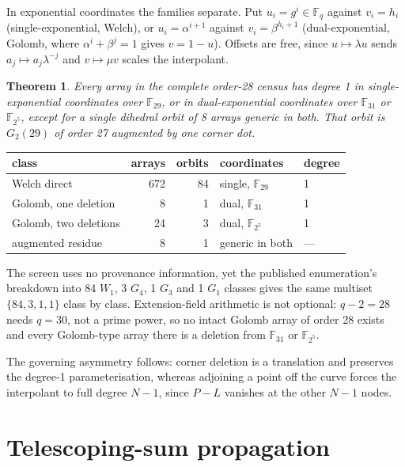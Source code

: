 \documentclass[11pt,a4paper]{article}
\newtheorem{theorem}{Theorem}[section]
\theoremstyle{definition}
\theoremstyle{remark}
\newcommand{\F}{\mathbb{F}}
\begin{document}
In exponential coordinates the families separate. Put $u_i=g^i\in\F_q$ against
$v_i=h_i$ (single-exponential, Welch), or $u_i=\alpha^{i+1}$ against
$v_i=\beta^{h_i+1}$ (dual-exponential, Golomb, where $\alpha^i+\beta^j=1$ gives
$v=1-u$). Offsets are free, since $u\mapsto\lambda u$ sends $a_j\mapsto
a_j\lambda^{-j}$ and $v\mapsto\mu v$ scales the interpolant.

\begin{theorem}\label{thm:coord}
Every array in the complete order-28 census has degree 1 in single-exponential
coordinates over $\F_{29}$, or in dual-exponential coordinates over $\F_{31}$ or
$\F_{2^5}$, except for a single dihedral orbit of 8 arrays generic in both. That
orbit is $G_2(29)$ of order 27 augmented by one corner dot.
\end{theorem}

\begin{center}
\begin{tabular}{@{}lrrll@{}}
\toprule
class & arrays & orbits & coordinates & degree \\
\midrule
Welch direct & 672 & 84 & single, $\F_{29}$ & 1 \\
Golomb, one deletion & 8 & 1 & dual, $\F_{31}$ & 1 \\
Golomb, two deletions & 24 & 3 & dual, $\F_{2^5}$ & 1 \\
augmented residue & 8 & 1 & generic in both & --- \\
\bottomrule
\end{tabular}
\end{center}

The screen uses no provenance information, yet the published enumeration's
breakdown into 84 $W_1$, 3 $G_4$, 1 $G_3$ and 1 $G_1$ classes gives the same
multiset $\{84,3,1,1\}$ class by class. Extension-field arithmetic is not
optional: $q-2=28$ needs $q=30$, not a prime power, so no intact Golomb array of
order 28 exists and every Golomb-type array there is a deletion from $\F_{31}$ or
$\F_{2^5}$.

The governing asymmetry follows: corner deletion is a translation and preserves
the degree-1 parameterisation, whereas adjoining a point off the curve forces the
interpolant to full degree $N-1$, since $P-L$ vanishes at the other $N-1$ nodes.

\section{Telescoping-sum propagation}
\label{sec:tm}
\end{document}
